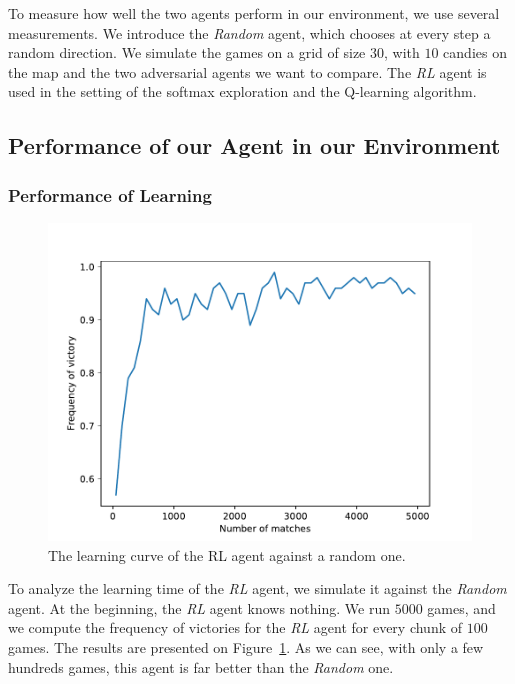 \documentclass[journal, a4paper]{IEEEtran}
\begin{document}
To measure how well the two agents perform in our environment, we use several measurements.
We introduce the \emph{Random} agent, which chooses at every step a random direction.
We simulate the games on a grid of size $30$, with $10$ candies on the map and the two adversarial agents we want to compare.
The \emph{RL} agent is used in the setting of the softmax exploration and the Q-learning algorithm.

\subsection{Performance of our Agent in our Environment}

\subsubsection{Performance of Learning}

\begin{figure}[h]
	\centering
    \includegraphics[width=0.95\columnwidth]{images/learning_curve_against_random.pdf}
    \caption{\label{learning_curve_against_random}The learning curve of the RL agent against a random one.}
\end{figure}

To analyze the learning time of the \emph{RL} agent, we simulate it against the \emph{Random} agent.
At the beginning, the \emph{RL} agent knows nothing.
We run $5000$ games, and we compute the frequency of victories for the \emph{RL} agent for every chunk of $100$ games.
The results are presented on Figure~\ref{learning_curve_against_random}.
As we can see, with only a few hundreds games, this agent is far better than the \emph{Random} one.
\end{document}

